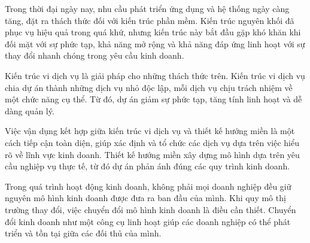 Trong thời đại ngày nay, nhu cầu phát triển ứng dụng và hệ thống ngày càng tăng, đặt ra thách thức đối với kiến trúc phần mềm. Kiến trúc nguyên khối đã phục vụ hiệu quả trong quá khứ, nhưng kiến trúc này bắt đầu gặp khó khăn khi đối mặt với sự phức tạp, khả năng mở rộng và khả năng đáp ứng linh hoạt với sự thay đổi nhanh chóng trong yêu cầu kinh doanh.

Kiến trúc vi dịch vụ là giải pháp cho những thách thức trên. Kiến trúc vi dịch vụ chia dự án thành những dịch vụ nhỏ độc lập, mỗi dịch vụ chịu trách nhiệm về một chức năng cụ thể. Từ đó, dự án giảm sự phức tạp, tăng tính linh hoạt và dễ dàng quản lý.

Việc vận dụng kết hợp giữa kiến trúc vi dịch vụ và thiết kế hướng miền là một cách tiếp cận toàn diện, giúp xác định và tổ chức các dịch vụ dựa trên việc hiểu rõ về lĩnh vực kinh doanh. Thiết kế hướng miền xây dựng mô hình dựa trên yêu cầu nghiệp vụ thực tế, từ đó dự án phản ánh đúng các quy trình kinh doanh.



Trong quá trình hoạt động kinh doanh, không phải mọi doanh nghiệp đều giữ nguyên mô hình kinh doanh được đưa ra ban đầu của mình. Khi quy mô thị trường thay đổi, việc chuyển đổi mô hình kinh doanh là điều cần thiết. Chuyển đổi kinh doanh như một công cụ linh hoạt giúp các doanh nghiệp có thể phát triển và tồn tại giữa các đối thủ của mình.

